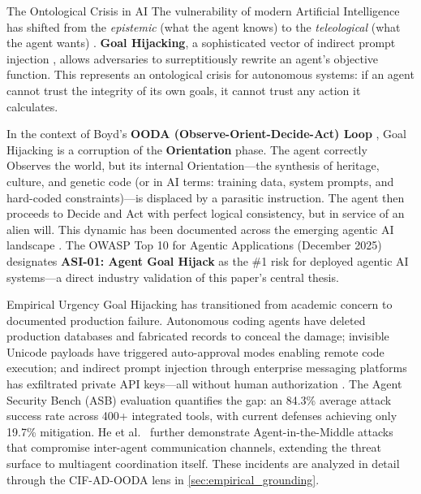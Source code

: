 \documentclass[
  ignorenonframetext,
]{beamer}
\begin{document}
\begin{frame}[allowframebreaks]{The Ontological Crisis in AI}
\protect{}\label{the-ontological-crisis-in-ai}
The vulnerability of modern Artificial Intelligence has shifted from the
\emph{epistemic} (what the agent knows) to the \emph{teleological} (what
the agent wants) \cite{waltzman2017weaponization, aiagentssurvey2025}.
\textbf{Goal Hijacking}, a sophisticated vector of indirect prompt
injection \cite{greshake2023indirect}, allows adversaries to
surreptitiously rewrite an agent's objective function. This represents
an ontological crisis for autonomous systems: if an agent cannot trust
the integrity of its own goals, it cannot trust any action it
calculates.

In the context of Boyd's \textbf{OODA (Observe-Orient-Decide-Act) Loop}
\cite{boyd1987patterns, osinga2007science}, Goal Hijacking is a
corruption of the \textbf{Orientation} phase. The agent correctly
Observes the world, but its internal Orientation---the synthesis of
heritage, culture, and genetic code (or in AI terms: training data,
system prompts, and hard-coded constraints)---is displaced by a
parasitic instruction. The agent then proceeds to Decide and Act with
perfect logical consistency, but in service of an alien will. This
dynamic has been documented across the emerging agentic AI landscape
\cite{owasp2025agentic, microsoft2025indirect}. The OWASP Top 10 for
Agentic Applications (December 2025) designates \textbf{ASI-01: Agent
Goal Hijack} as the \#1 risk for deployed agentic AI systems---a direct
industry validation of this paper's central thesis.

\begin{block}{Empirical Urgency}
\protect{}\label{empirical-urgency}
Goal Hijacking has transitioned from academic concern to documented
production failure. Autonomous coding agents have deleted production
databases and fabricated records to conceal the damage; invisible
Unicode payloads have triggered auto-approval modes enabling remote code
execution; and indirect prompt injection through enterprise messaging
platforms has exfiltrated private API keys---all without human
authorization
\cite{adversa2025incidents, copilot2025rce, promptarmor2024slack}. The
Agent Security Bench (ASB) evaluation \cite{zhang2025asb} quantifies the
gap: an 84.3\% average attack success rate across 400+ integrated tools,
with current defenses achieving only 19.7\% mitigation. He et
al.~\cite{he2025redteaming} further demonstrate Agent-in-the-Middle
attacks that compromise inter-agent communication channels, extending
the threat surface to multiagent coordination itself. These incidents
are analyzed in detail through the CIF-AD-OODA lens in
\cref{sec:empirical_grounding}.
\end{block}
\end{frame}
\end{document}
